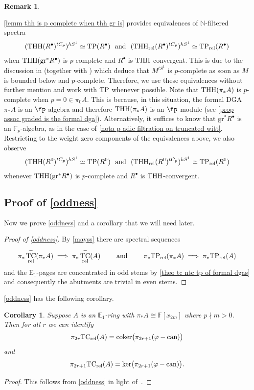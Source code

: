 \documentclass[english,10pt]{amsart}
\newcommand{\RomanNumeralCaps}[1]
    {\MakeUppercase{\romannumeral #1}}
\newcommand{\rel}{\textup{rel}}
\newcommand{\field}{\mathbb{F}}
\newtheorem{cor}{Corollary}[section]
\theoremstyle{definition}
\newtheorem{rema}{Remark}[section]
\numberwithin{equation}{section}
\DeclareMathOperator{\TC}{TC}
\DeclareMathOperator{\tp}{\ensuremath{\textup{TP}}}
\DeclareMathOperator{\thh}{\ensuremath{\textup{THH}}}
\newcommand{\rtp}{\mathrm{TP}_{\rel}}
\newcommand{\rtc}{\mathrm{TC}_{\rel}}
\newcommand{\rthh}{\mathrm{THH}_{\rel}}
\DeclareMathOperator{\can}{\ensuremath{\textup{can}}}
\newcommand{\TP}{\mathrm{TP}}
\newcommand{\N}{\mathbb{N}}
\newcommand{\pis}{\pi_*}
\newcommand{\gr}{\textup{gr}^*}
\begin{document}
\begin{rema}\label{rema tcp and then hs1 agree with ts1 when p complete} 

 \autoref{lemm thh is p complete when thh gr is} provides equivalences of $\N$-filtered spectra
\[(\thh(R^{\bullet})^{tC_p})^{hS^1}\simeq \tp(R^{\bullet}) \textup{\ \ and \ }(\rthh(R^{\bullet})^{tC_p})^{hS^1}\simeq \rtp(R^{\bullet})\] 
when $\thh(\gr R^{\bullet})$ is $p$-complete and $R^\bullet$ is $\thh$-convergent. This is due to the discussion in \cite[Section 2.3]{bhatt2019thhandintegralpadichodge} (together with  \cite[Lemma \RomanNumeralCaps{2}.4.2]{nikolausscholze2018topologicalcyclic}) which deduce that $M^{tS^1}$ is $p$-complete as soon as $M$ is bounded below and $p$-complete. Therefore, we use these equivalences without further mention and work with $\tp$ whenever possible. Note that $\thh(\pis A)$ is $p$-complete when $p=0 \in \pi_0A$. This is because, in this situation, the formal DGA $\pis A$ is an $\fp$-algebra and therefore $\thh(\pis A)$ is an   $\fp$-module (see \autoref{prop assoc graded is the formal dga}). Alternatively, it suffices to know that $\mathrm{gr}^*R^{\bullet}$ is an $\field_p$-algebra, as in the case of \autoref{nota  p adic filtration on truncated witt}. Restricting to the weight zero components of the equivalences above, we also observe
\[(\thh(R^0)^{tC_p})^{hS^1}\simeq \tp(R^0) \textup{\ \ and \ }(\rthh(R^0)^{tC_p})^{hS^1}\simeq \rtp(R^0)\] 
whenever $\thh(\gr R^{\bullet})$ is $p$-complete and $R^\bullet$ is $\thh$-convergent. 
\end{rema}

\subsection{Proof of \autoref{oddness}}\label{proof-oddness}
Now we prove \autoref{oddness} and a corollary that we will need later. 
\oddnessofntcandtp*
\begin{proof}[Proof of \autoref{oddness}]
By \autoref{mayss} there are spectral sequences 
\[
\pi_*\TC^{-}_{\rel}(\pi_*A)\implies \pi_*\TC^{-}_{\rel}(A)  \qquad \text{ and }\qquad
\pi_*\TP_{\rel}(\pi_*A)\implies \pi_*\TP_{\rel}(A) 
\]
and the $\mathrm{E}_1$-pages are concentrated in odd stems by \autoref{theo tc ntc tp of formal dgas} and consequently the abutments are trivial in even stems. 
\end{proof}

\autoref{oddness} has the following corollary. 

\begin{cor}\label{cor tc in terms of ker and coker}
    Suppose $A$ is an $\mathbb{E}_1$-ring with $\pi_*A\cong\field[x_{2m}]$  where $p\nmid m>0$.  Then for all $r$ we can identify
     \[\pi_{2r}\rtc(A) = \textup{coker}\big(\pi_{2r+1}(\varphi - \can)\big)\]
     and
     \[\pi_{2r+1}\rtc(A) = \textup{ker}\big(\pi_{2r+1}(\varphi - \can)\big).\]
\end{cor}
\begin{proof}
    This follows from \autoref{oddness} in light of~\cite[Corollary~1.5]{nikolausscholze2018topologicalcyclic}. 
\end{proof}
\end{document}
